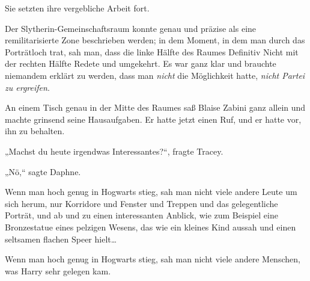 Sie setzten ihre vergebliche Arbeit fort.


Der Slytherin-Gemeinschaftsraum konnte genau und präzise als eine remilitarisierte Zone beschrieben werden; in dem Moment, in dem man durch das Porträtloch trat, sah man, dass die linke Hälfte des Raumes Definitiv Nicht mit der rechten Hälfte Redete und umgekehrt. Es war ganz klar und brauchte niemandem erklärt zu werden, dass man \emph{nicht} die Möglichkeit hatte, \emph{nicht Partei zu ergreifen}.

An einem Tisch genau in der Mitte des Raumes saß Blaise Zabini ganz allein und machte grinsend seine Hausaufgaben. Er hatte jetzt einen Ruf, und er hatte vor, ihn zu behalten.


„Machst du heute irgendwas Interessantes?“, fragte Tracey.

„Nö,“ sagte Daphne.


Wenn man hoch genug in Hogwarts stieg, sah man nicht viele andere Leute um sich herum, nur Korridore und Fenster und Treppen und das gelegentliche Porträt, und ab und zu einen interessanten Anblick, wie zum Beispiel eine Bronzestatue eines pelzigen Wesens, das wie ein kleines Kind aussah und einen seltsamen flachen Speer hielt…

Wenn man hoch genug in Hogwarts stieg, sah man nicht viele andere Menschen, was Harry sehr gelegen kam.

